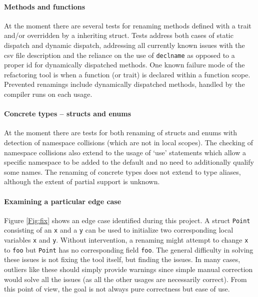 
\paragraph{Methods and functions}
At the moment there are several tests for renaming methods defined with a trait and/or overridden by a inheriting struct. Tests address both cases of static dispatch and dynamic dispatch, addressing all currently known issues with the csv file description and the reliance on the use of {\verb|declname|} as opposed to a proper id for dynamically dispatched methods. One known failure mode of the refactoring tool is when a function (or trait) is declared within a function scope. Prevented renamings include dynamically dispatched methods, handled by the compiler runs on each usage.

\paragraph{Concrete types -- structs and enums}
At the moment there are tests for both renaming of structs and enums with detection of namespace collisions (which are not in local scopes). The checking of namespace collisions also extend to the usage of `use' statements which allow a specific namespace to be added to the default and no need to additionally qualify some names. The renaming of concrete types does not extend to type aliases, although the extent of partial support is unknown.

\paragraph{Examining a particular edge case}
Figure \ref{Fig:fix} shows an edge case identified during this project. A struct {\verb|Point|} consisting of an {\verb|x|} and a {\verb|y|} can be used to initialize two corresponding local variables {\verb|x|} and {\verb|y|}. Without intervention, a renaming might attempt to change {\verb|x|} to  {\verb|foo|} but {\verb|Point|} has no corresponding field {\verb|foo|}. The general difficulty in solving these issues is not fixing the tool itself, but finding the issues. In many cases, outliers like these should simply provide warnings since simple manual correction would solve all the issues (as all the other usages are necessarily correct). From this point of view, the goal is not always pure correctness but ease of use.

